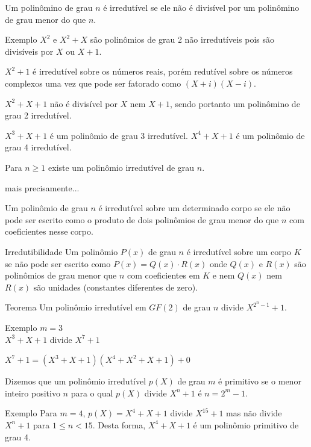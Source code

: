 \begin{frame}[allowframebreaks]
  \framebreak
  Um polinômino de grau $n$ é irredutível se ele não é divisível por um polinômino de grau menor do que $n$.

  \begin{block}{Exemplo}
    $X^2$ e $X^2 + X$ são polinômios de grau 2 não irredutíveis pois são divisíveis por $X$ ou $X+1$.

    \vspace{2ex}
    $X^2+1$ é irredutível sobre os números reais, porém redutível sobre os números complexos uma vez que pode ser fatorado como $(X+i)(X-i)$.

    \vspace{2ex}
    $X^2 + X + 1$ não é divisível por $X$ nem $X+1$, sendo portanto um polinômino de grau 2 irredutível.

    \vspace{2ex}
    $X^3 + X + 1$ é um polinômio de grau 3 irredutível. $X^4 + X + 1$ é um polinômio de grau 4 irredutível.

    \vspace{2ex}
    Para $n \geq 1$ existe um polinômio irredutível de grau $n$.
  \end{block}

  \framebreak
  mais precisamente...

  Um polinômio de grau $n$ é irredutível sobre um determinado corpo se ele não pode ser escrito como o produto de dois polinômios de grau menor do que $n$ com coeficientes nesse corpo. 

  \begin{block}{Irredutibilidade}
  Um polinômio $P(x)$ de grau $n$ é irredutível sobre um corpo $K$ se não pode ser escrito como $P(x)=Q(x)\cdot R(x)$ onde $Q(x)$ e $R(x)$
  são polinômios de grau menor que $n$ com coeficientes em $K$ e nem $Q(x)$ nem $R(x)$ são unidades (constantes diferentes de zero).
  \end{block}

  \framebreak
  \begin{block}{Teorema}
    Um polinômio irredutível em $GF(2)$ de grau $n$ divide $X^{2^n-1}+1$.
  \end{block}

  \begin{block}{Exemplo}
    $m=3$\\
    $X^3+X+1$ divide $X^7+1$

    $X^7+1 = (X^3+X+1)(X^4 + X^2 + X + 1) + 0$
  \end{block}

  \framebreak
  Dizemos que um polinômio irredutível $p(X)$ de grau $m$ é primitivo se o menor inteiro positivo $n$ para o qual $p(X)$ divide $X^n+1$ é $n=2^m-1$.
  \begin{block}{Exemplo}
  Para $m=4$, $p(X)=X^4+X+1$ divide $X^{15}+1$ mas não divide $X^n+1$ para $1 \leq n < 15$. Desta forma, $X^4+X+1$ é um polinômio primitivo de grau 4.
  \end{block}


\end{frame}
